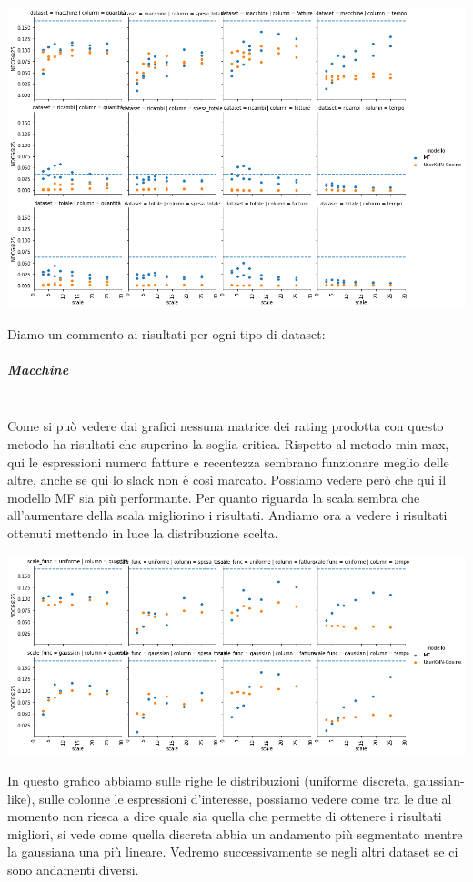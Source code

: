 \includegraphics[width=16cm]{figures/risultati_ordered_globale.png}


Diamo un commento ai risultati per ogni tipo di dataset:\\
\subparagraph{Macchine}\mbox{} \\
Come si può vedere dai grafici nessuna matrice dei rating prodotta con questo metodo ha risultati che superino la soglia critica. 
Rispetto al metodo min-max, qui le espressioni numero fatture e recentezza sembrano funzionare meglio delle altre, anche se qui lo slack non è così marcato. Possiamo vedere però che qui il modello MF sia più performante. Per quanto riguarda la scala sembra che all'aumentare della scala migliorino i risultati. Andiamo ora a vedere i risultati ottenuti mettendo in luce la distribuzione scelta.

\includegraphics[width=16cm]{figures/scale_func_ordered_global.png}

In questo grafico abbiamo sulle righe le distribuzioni (uniforme discreta, gaussian-like), sulle colonne le espressioni d'interesse, possiamo vedere come tra le due al momento non riesca a dire quale sia quella che permette di ottenere i risultati migliori, si vede come quella discreta abbia un andamento più segmentato mentre la gaussiana una più lineare. Vedremo successivamente se negli altri dataset se ci sono andamenti diversi.

